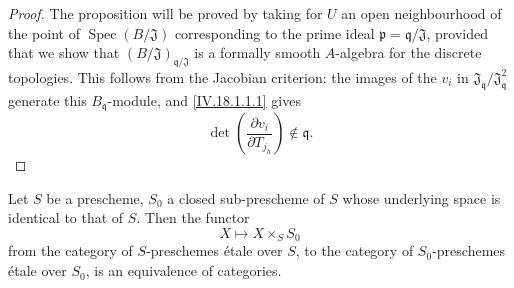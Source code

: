 \begin{proof}

The proposition will be proved by taking for $U$ an open neighbourhood of the point of $\operatorname{Spec}(B/\mathfrak{J})$ corresponding to the prime ideal $\mathfrak p=\mathfrak q/\mathfrak{J}$, provided that we show that $(B/\mathfrak{J})_{\mathfrak q/\mathfrak{J}}$ is a formally smooth $A$-algebra for the discrete topologies.  This follows from the Jacobian criterion: the images of the $v_i$ in $\mathfrak{J}_{\mathfrak q}/\mathfrak{J}_{\mathfrak q}^2$ generate this $B_{\mathfrak q}$-module, and \eqref{IV.18.1.1.1} gives
\[
 \det\left(\frac{\partial v_i}{\partial T_{j_h}}\right)\notin\mathfrak q.
\]
\end{proof}

\begin{theorem}[18.1.2]
\label{IV.18.1.2}
Let $S$ be a prescheme, $S_0$ a closed sub-prescheme of $S$ whose underlying space is identical to that of $S$.
Then the functor
\[
X\mapsto X\times_S S_0
\]
from the category of $S$-preschemes \'etale over $S$, to the category of $S_0$-preschemes \'etale over $S_0$, is an equivalence of categories.
\end{theorem}

